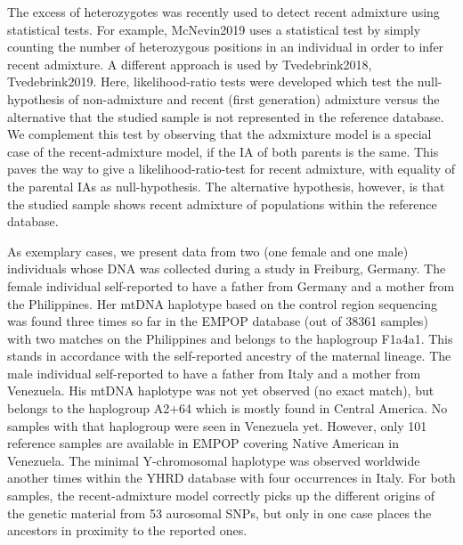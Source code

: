 \documentclass[12pt]{article}
\theoremstyle{definition}
\begin{document}
The excess of heterozygotes was recently used to detect recent
admixture using statistical tests. For example,
\cite{article}{McNevin2019} uses a statistical test by simply counting
the number of heterozygous positions in an individual in order to
infer recent admixture. A different approach is used by
\cite{article}{Tvedebrink2018, Tvedebrink2019}. Here,
likelihood-ratio tests were developed which test the null-hypothesis
of non-admixture and recent (first generation) admixture versus the
alternative that the studied sample is not represented in the
reference database. We complement this test by observing that the
adxmixture model is a special case of the recent-admixture model, if
the IA of both parents is the same. This paves the way to give a
likelihood-ratio-test for recent admixture, with equality of the
parental IAs as null-hypothesis. The alternative hypothesis, however,
is that the studied sample shows recent admixture of populations
within the reference database.

As exemplary cases, we present data from two (one female and one male)
individuals whose DNA was collected during a study in Freiburg,
Germany. The female individual self-reported to have a father from
Germany and a mother from the Philippines. Her mtDNA haplotype based
on the control region sequencing was found three times so far in the
EMPOP database (out of 38361 samples) with two matches on the
Philippines and belongs to the haplogroup F1a4a1. This stands in
accordance with the self-reported ancestry of the maternal
lineage. The male individual self-reported to have a father from Italy
and a mother from Venezuela. His mtDNA haplotype was not yet observed
(no exact match), but belongs to the haplogroup A2+64 which is mostly
found in Central America. No samples with that haplogroup were seen in
Venezuela yet. However, only 101 reference samples are available in
EMPOP covering Native American in Venezuela. The minimal Y-chromosomal
haplotype was observed worldwide another times within the YHRD
database with four occurrences in Italy. For both samples, the
recent-admixture model correctly picks up the different origins of the
genetic material from 53 aurosomal SNPs, but only in one case places
the ancestors in proximity to the reported ones.
\end{document}
